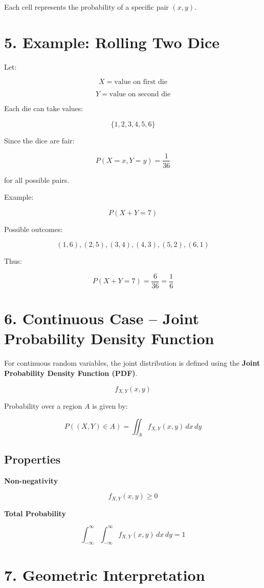 \documentclass[11pt]{article}
\begin{document}
Each cell represents the probability of a specific pair $(x,y)$.

\section*{5. Example: Rolling Two Dice}

Let:

\[
X = \text{value on first die}
\]

\[
Y = \text{value on second die}
\]

Each die can take values:

\[
\{1,2,3,4,5,6\}
\]

Since the dice are fair:

\[
P(X=x,Y=y) = \frac{1}{36}
\]

for all possible pairs.

Example:

\[
P(X+Y=7)
\]

Possible outcomes:

\[
(1,6),(2,5),(3,4),(4,3),(5,2),(6,1)
\]

Thus:

\[
P(X+Y=7)=\frac{6}{36}=\frac{1}{6}
\]

\section*{6. Continuous Case – Joint Probability Density Function}

For continuous random variables, the joint distribution is defined using the \textbf{Joint Probability Density Function (PDF)}.

\[
f_{X,Y}(x,y)
\]

Probability over a region $A$ is given by:

\[
P((X,Y)\in A)=\iint_A f_{X,Y}(x,y)\,dx\,dy
\]

\subsection*{Properties}

\textbf{Non-negativity}

\[
f_{X,Y}(x,y)\ge0
\]

\textbf{Total Probability}

\[
\int_{-\infty}^{\infty}\int_{-\infty}^{\infty} f_{X,Y}(x,y)\,dx\,dy=1
\]

\section*{7. Geometric Interpretation}
\end{document}
